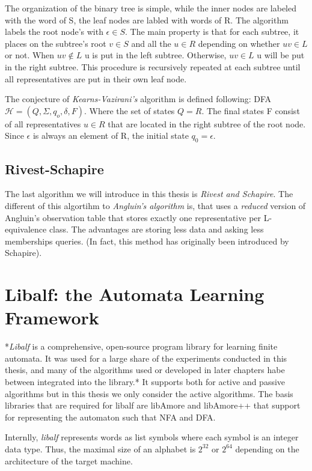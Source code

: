 The organization of the binary tree is simple, while the inner nodes are labeled with 
the word of S, the leaf nodes are labled with words of R. The algorithm labels the root node's 
with $\epsilon \in S$.
The main property is that for each subtree, it places on the subtree's root $v \in S$
and all the $u \in R$ depending on whether $uv \in L$ or not. When $uv \notin L$ u is put in the left subtree.
Otherwise, $uv \in L$ u will be put in the right subtree. 
This procedure is recursively repeated at each subtree until all representatives
are put in their own leaf node.

The conjecture of \textit{Kearns-Vazirani's} algorithm is defined following: DFA $\mathcal{H} = (Q, \Sigma, q_o, \delta, F)$.
Where the set of states $Q = R$. The final states F consist of all representatives $u \in R$
that are located in the right subtree of the root node. 
Since $\epsilon$ is always an element of R, the initial state $q_0 = \epsilon$.
\subsection{Rivest-Schapire}
The last algorithm we will introduce in this thesis is \textit{Rivest and Schapire}.
The different of this algortihm to \textit{Angluin's algorithm} is,
that uses a \textit{reduced} version of Angluin's observation table
that stores exactly one representative per L-equivalence class.
The advantages are storing less data and asking less memberships queries.
(In fact, this method has originally been introduced by Schapire). 
\section{Libalf: the Automata Learning Framework}\label{section:libalf}
*\textit{Libalf} is a comprehensive, open-source program library
for learning finite automata. It was used for a large share of the
experiments conducted in this thesis, and many of the 
algorithms used or developed in later chapters habe between
integrated into the library.*
It supports both for active and passive algorithms but 
in this thesis we only consider the active algorithms.
The basis libraries that are required for libalf are libAmore and
libAmore++ that support for representing the automaton
such that NFA and DFA.

Internlly, \textit{libalf} represents words as list symbols
where each symbol is an integer data type. Thus, the maximal size
of an alphabet is $2^{32}$ or $2^{64}$ depending on the architecture of the 
target machine.
